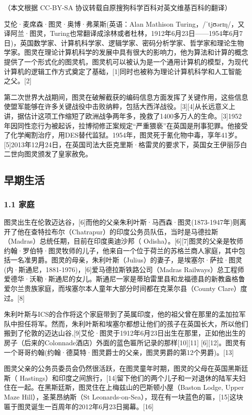 
（本文根据 CC-BY-SA 协议转载自原搜狗科学百科对英文维基百科的翻译）

艾伦·麦席森·图灵·奥博·弗莱斯(英语：Alan Mathison Turing，/ˈtjʊərɪŋ/，又译阿兰·图灵，Turing也常翻译成涂林或者杜林，1912年6月23日——1954年6月7日)，英国数学家、计算机科学家、逻辑学家、密码分析学家、哲学家和理论生物学家。图灵在理论计算机科学的发展中具有很大的影响力，他为算法和计算的概念提供了一个形式化的图灵机，图灵机可以被认为是一个通用计算机的模型，为现代计算机的逻辑工作方式奠定了基础，[1]同时也被称为理论计算机科学和人工智能之父。[2]

第二次世界大战期间，图灵在破解截获的编码信息方面发挥了关键作用，这些信息使盟军能够在许多关键战役中击败纳粹，包括大西洋战役。[3][4]从长远意义上讲，据估计这项工作缩短了欧洲战争两年多，挽救了1400多万人的生命。[3]1952年因同性恋行为被起诉，拉博彻修正案规定“严重猥亵”在英国是刑事犯罪。他接受了化学阉割治疗，用DES替代监狱。1954年，图灵死于氰化物中毒，享年41岁。[5]2013年12月24日，在英国司法大臣克里斯·格雷灵的要求下，英国女王伊丽莎白二世向图灵颁发了皇家赦免。

\subsection{ 早期生活}
\subsubsection{1.1 家庭}
图灵出生在伦敦迈达谷，[6]而他的父亲朱利叶斯·马西森·图灵(1873-1947年)则离开了他在查特拉布尔（Chatrapur）的印度公务员队伍，当时是马德拉斯（Madras）总统任期，目前在印度奥迪沙邦（ Odisha）。[6][7]图灵的父亲是牧师约翰·罗伯特·图灵牧师的儿子，他来自一个位于荷兰的苏格兰商人家庭，其中包括一名准男爵。图灵的母亲，朱利叶斯（Julius）的妻子，是埃塞尔·萨拉·图灵(内·斯通尼，1881-1976)，[6]爱马德拉斯铁路公司（Madras Railways）总工程师爱德华·沃勒·斯通尼的女儿。斯通尼一家是蒂珀雷里县和龙福德县的新教盎格鲁爱尔兰贵族家庭，而埃塞尔本人童年大部分时间都在克莱尔县（County Clare）度过。[8]

朱利叶斯与ICS的合作将这个家庭带到了英属印度，他的祖父曾在那里的孟加拉军队中担任将军。然而，朱利叶斯和埃塞尔都想让他们的孩子在英国长大，所以他们搬到了伦敦的迈达山谷,[9]艾伦·图灵于1912年6月23日出生在那里，正如他出生的房子（后来的Colonnade酒店）外面的蓝色匾所记录的那样[10][11] [6][12]。图灵有一个哥哥约翰(约翰·德莫特·图灵爵士的父亲，图灵男爵的第12个男爵)。[13]

图灵父亲的公务员委员会仍然很活跃，在图灵童年时期，图灵的父母在英国黑斯廷斯（ Hastings）和印度之间旅行，[14]留下他们的两个儿子和一对退休的陆军夫妇住在一起。在黑斯廷斯，图灵住在上梅兹山的巴斯顿小屋（Baston Lodge, Upper Maze Hill），圣莱昂纳斯（St Leonards-on-Sea），现在有一块蓝色的匾，[15]这块匾于图灵诞生一百周年的2012年6月23日揭幕。[16]


